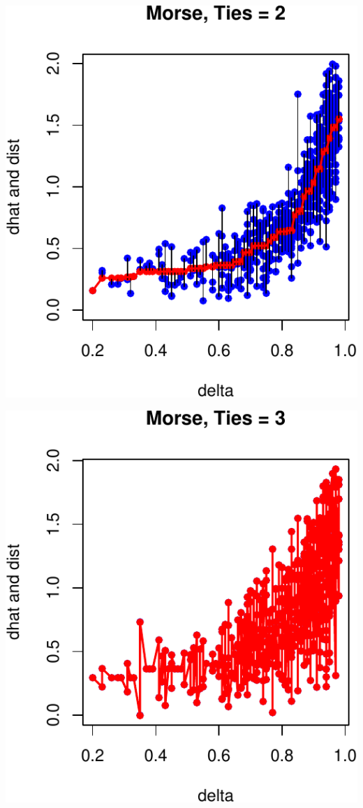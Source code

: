 \documentclass[
  12pt,
]{article}
\begin{document}
\begin{center}\includegraphics{smacofRO_files/figure-latex/plotmorse-2} \end{center}

\begin{center}\includegraphics{smacofRO_files/figure-latex/plotmorse-3} \end{center}
\end{document}
